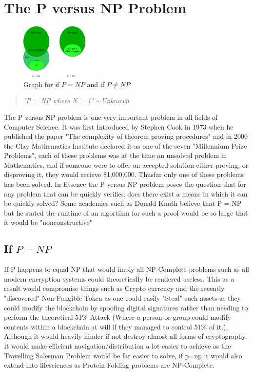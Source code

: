 \documentclass{article}
\begin{document}
	\section{The P versus NP Problem}
		\begin{figure}[H]
			\centering
			\includegraphics[width=0.3\textwidth]{p_np.png}
			\caption{Graph for if $P = NP$ and if $P \neq NP$ \citep{pnpimage}}
		\end{figure}
		\begin{quote}
		\centering
		\textit{"P = NP where N = 1" $\sim$Unknown}
		\end{quote}
	The P versus NP problem is one very important problem in all fields of Computer Science. It was first Introduced by Stephen Cook in 1973 when he published the paper "The complexity of theorem proving procedures" and in 2000 the Clay Mathematics Institute declared it as one of the seven "Millennium Prize Problems", each of these problems was at the time an unsolved problem in Mathematics, and if someone were to offer an accepted solution either proving, or disproving it, they would recieve \$1,000,000. Thusfar only one of these problems has been solved. In Essence the P versus NP problem poses the question that for any problem that can be quickly verified does there exist a means in which it can be quickly solved? Some academics such as Donald Knuth believe that P = NP but he stated the runtime of an algortihm for such a proof would be so large that it would be "nonconstructive" \citep{informit}
	\subsection{If $P = NP$}
		If P happens to equal NP that would imply all NP-Complete problems such as all modern encryption systems could theoretically be rendered useless. This as a result would compromise things such as Crypto currency and the recently "discovered" Non-Fungible Token as one could easily "Steal" such assets as they could modify the blockchain by spoofing digital signatures rather than needing to perform the theoretical 51\% Attack (Where a person or group could modify contents within a blockchain at will if they managed to control 51\% of it.), Although it would heavily hinder if not destroy almost all forms of cryptography, It would make efficient navigation/distribution a lot easier to achieve as the Travelling Salesman Problem would be far easier to solve, if p=np it would also extend into lifesciences as Protein Folding problems are NP-Complete. \citep{Berger98proteinfolding}
\end{document}
